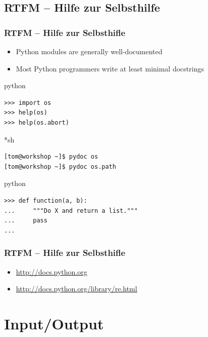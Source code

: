 \documentclass{beamer}
\begin{document}
\subsection{RTFM -- Hilfe zur Selbsthilfe}
\begin{frame}[fragile]
	\frametitle{RTFM -- Hilfe zur Selbsthifle}

	\begin{itemize}
		\item Python modules are generally well-documented
		\item Most Python programmers write at least minimal docstrings
	\end{itemize}

\pause

	\begin{exampleblock}{python}
	\begin{lstlisting}
>>> import os
>>> help(os)
>>> help(os.abort)
	\end{lstlisting}
	\end{exampleblock}

\pause

	\begin{exampleblock}{*sh}
	\begin{lstlisting}
[tom@workshop ~]$ pydoc os
[tom@workshop ~]$ pydoc os.path
	\end{lstlisting}
	\end{exampleblock}

\pause

	\begin{exampleblock}{python}
	\begin{lstlisting}
>>> def function(a, b):
...     """Do X and return a list."""
...     pass
...
	\end{lstlisting}
	\end{exampleblock}
\end{frame}

\begin{frame}[fragile]
	\frametitle{RTFM -- Hilfe zur Selbsthifle}
	
	\begin{itemize}
		\item \url{http://docs.python.org}
		\item \url{http://docs.python.org/library/re.html}
	\end{itemize}

\end{frame}

\section{Input/Output } 
\end{document}
